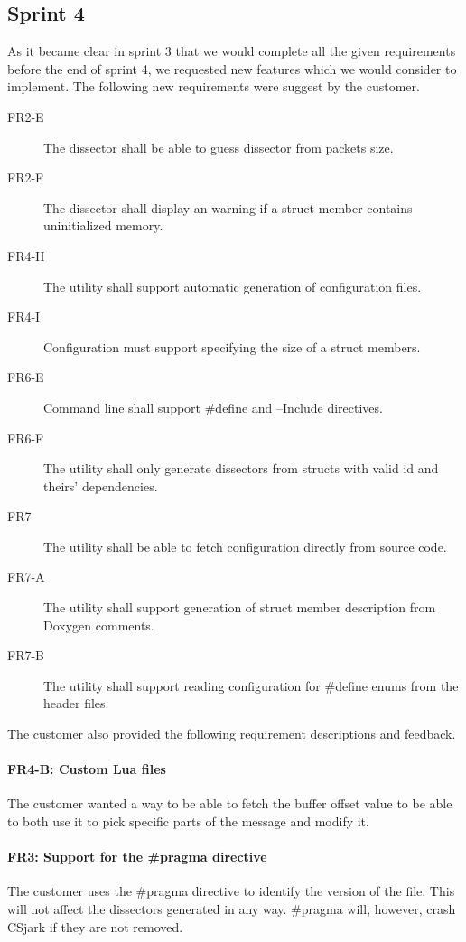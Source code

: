 \subsection{Sprint 4}
\label{sec:req:sprint4evo}
As it became clear in sprint 3 that we would complete all the given
requirements before the end of sprint 4, we requested new features which we
would consider to implement. The following new requirements were suggest by
the customer.
\begin{description}
	\item[FR2-E] The \gls{dissector} shall be able to guess dissector from packets size.
	\item[FR2-F] The \gls{dissector} shall display an warning if a struct member contains uninitialized memory.
	\item[FR4-H] The utility shall support automatic generation of configuration files.
	\item[FR4-I] Configuration must support specifying the size of a struct members.
	\item[FR6-E] Command line shall support \#define and --Include directives.
	\item[FR6-F] The utility shall only generate dissectors from structs with valid id and theirs' dependencies.
	\item[FR7] The utility shall be able to fetch configuration directly from source code.
	\item[FR7-A] The utility shall support generation of struct member description from Doxygen comments.
	\item[FR7-B] The utility shall support reading configuration for \#define enums from the header files.
\end{description}

\noindent The customer also provided the following requirement descriptions
and feedback.
\paragraph{FR4-B: Custom Lua files}
The customer wanted a way to be able to fetch the buffer offset value to be
able to both use it to pick specific parts of the message and modify it.

\paragraph{FR3: Support for the \#pragma directive}
The customer uses the \#pragma directive to identify the version of the file.
This will not affect the dissectors generated in any way. \#pragma will,
however, crash CSjark if they are not removed.

